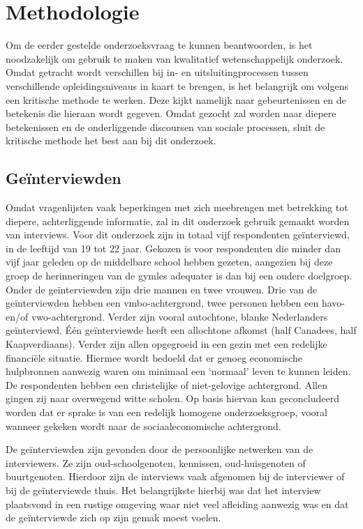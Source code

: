 \documentclass[a4paper,12pt]{memoir}
\begin{document}
\chapter{Methodologie}

Om de eerder gestelde onderzoeksvraag te kunnen beantwoorden, is het noodzakelijk om gebruik te maken van kwalitatief wetenschappelijk onderzoek. Omdat getracht wordt verschillen bij in- en uitsluitingprocessen tussen verschillende opleidingsniveaus in kaart te brengen, is het belangrijk om volgens een kritische methode te werken. Deze kijkt namelijk naar gebeurtenissen en de betekenis die hieraan wordt gegeven. Omdat gezocht zal worden naar diepere betekenissen en de onderliggende discoursen van sociale processen, sluit de kritische methode het best aan bij dit onderzoek.

\section{Geïnterviewden}

Omdat vragenlijsten vaak beperkingen met zich meebrengen met betrekking tot diepere, achterliggende informatie, zal in dit onderzoek gebruik gemaakt worden van interviews. Voor dit onderzoek zijn in totaal vijf respondenten geïnterviewd, in de leeftijd van 19 tot 22 jaar. Gekozen is voor respondenten die minder dan vijf jaar geleden op de middelbare school hebben gezeten, aangezien bij deze groep de herinneringen van de gymles adequater is dan bij een oudere doelgroep. Onder de geïnterviewden zijn drie mannen en twee vrouwen. Drie van de geïnterviewden hebben een vmbo-achtergrond, twee personen hebben een havo- en/of vwo-achtergrond. Verder zijn vooral autochtone, blanke Nederlanders geïnterviewd. Één geïnterviewde heeft een allochtone afkomst (half Canadees, half Kaapverdiaans). Verder zijn allen opgegroeid in een gezin met een redelijke financiële situatie. Hiermee wordt bedoeld dat er genoeg economische hulpbronnen aanwezig waren om minimaal een `normaal' leven te kunnen leiden. De respondenten hebben een christelijke of niet-gelovige achtergrond. Allen gingen zij naar overwegend witte scholen. Op basis hiervan kan geconcludeerd worden dat er sprake is van een redelijk homogene onderzoeksgroep, vooral wanneer gekeken wordt naar de sociaaleconomische achtergrond.

De geïnterviewden zijn gevonden door de persoonlijke netwerken van de interviewers. Ze zijn oud-schoolgenoten, kennissen, oud-huisgenoten of buurtgenoten. Hierdoor zijn de interviews vaak afgenomen bij de interviewer of bij de geïnterviewde thuis. Het belangrijkste hierbij was dat het interview plaatsvond in een rustige omgeving waar niet veel afleiding aanwezig was en dat de geïnterviewde zich op zijn gemak moest voelen.
\end{document}
